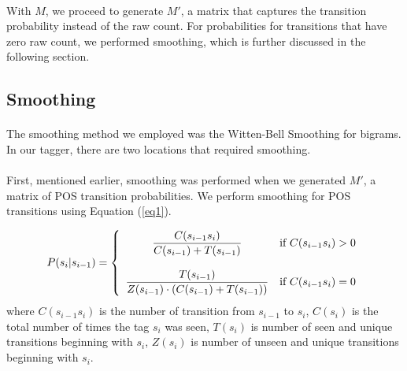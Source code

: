 \documentclass[12pt]{article}
\begin{document}
\paragraph{}
With $M$, we proceed to generate $M'$, a matrix that captures the transition probability instead of the raw count. For probabilities for transitions that have zero raw count, we performed smoothing, which is further discussed in the following section.

\subsection{Smoothing}
\paragraph{}
The smoothing method we employed was the Witten-Bell Smoothing for bigrams. In our tagger, there are two locations that required smoothing.

\paragraph{}
First, mentioned earlier, smoothing was performed when we generated $M'$, a matrix of POS transition probabilities. We perform smoothing for POS transitions using Equation (\ref{eq1}).

\begin{equation}
\label{eq1}
P(s_i | s_{i-1}) = \left\{ 
					\begin{array}{c l}
					\displaystyle \frac{C(s_{i-1} s_i)}{C(s_{i-1}) + T(s_{i-1})} & \textrm{if}~C(s_{i-1} s_i) > 0 \\\\
					\displaystyle \frac{T(s_{i-1})}{Z(s_{i-1}) \cdot (C(s_{i-1}) + T(s_{i-1}))} & \textrm{if}~C(s_{i-1} s_i) = 0
					\end{array}
					\right.
\end{equation}
where $C(s_{i-1} s_i)$ is the number of transition from $s_{i-1}$ to $s_i$, $C(s_i)$ is the total number of times the tag $s_i$ was seen, $T(s_i)$ is number of seen and unique transitions beginning with $s_i$, $Z(s_i)$ is number of unseen and unique transitions beginning with $s_i$.
\end{document}
